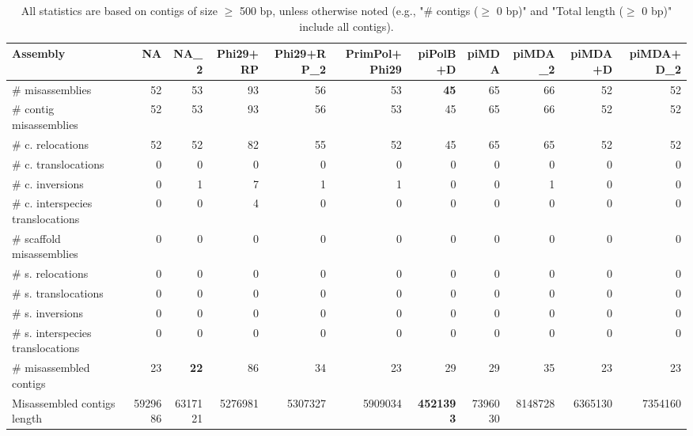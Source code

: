 \documentclass[12pt,a4paper]{article}
\begin{document}
\begin{table}[ht]
\begin{center}
\caption{All statistics are based on contigs of size $\geq$ 500 bp, unless otherwise noted (e.g., "\# contigs ($\geq$ 0 bp)" and "Total length ($\geq$ 0 bp)" include all contigs).}
\begin{tabular}{|l*{10}{|r}|}
\hline
Assembly & NA & NA\_2 & Phi29+RP & Phi29+RP\_2 & PrimPol+Phi29 & piPolB+D & piMDA & piMDA\_2 & piMDA+D & piMDA+D\_2 \\ \hline
\# misassemblies & 52 & 53 & 93 & 56 & 53 & {\bf 45} & 65 & 66 & 52 & 52 \\ \hline
\hspace{2mm}\# contig misassemblies & 52 & 53 & 93 & 56 & 53 & 45 & 65 & 66 & 52 & 52 \\ \hline
\hspace{5mm}\# c. relocations & 52 & 52 & 82 & 55 & 52 & 45 & 65 & 65 & 52 & 52 \\ \hline
\hspace{5mm}\# c. translocations & 0 & 0 & 0 & 0 & 0 & 0 & 0 & 0 & 0 & 0 \\ \hline
\hspace{5mm}\# c. inversions & 0 & 1 & 7 & 1 & 1 & 0 & 0 & 1 & 0 & 0 \\ \hline
\hspace{5mm}\# c. interspecies translocations & 0 & 0 & 4 & 0 & 0 & 0 & 0 & 0 & 0 & 0 \\ \hline
\hspace{2mm}\# scaffold misassemblies & 0 & 0 & 0 & 0 & 0 & 0 & 0 & 0 & 0 & 0 \\ \hline
\hspace{5mm}\# s. relocations & 0 & 0 & 0 & 0 & 0 & 0 & 0 & 0 & 0 & 0 \\ \hline
\hspace{5mm}\# s. translocations & 0 & 0 & 0 & 0 & 0 & 0 & 0 & 0 & 0 & 0 \\ \hline
\hspace{5mm}\# s. inversions & 0 & 0 & 0 & 0 & 0 & 0 & 0 & 0 & 0 & 0 \\ \hline
\hspace{5mm}\# s. interspecies translocations & 0 & 0 & 0 & 0 & 0 & 0 & 0 & 0 & 0 & 0 \\ \hline
\# misassembled contigs & 23 & {\bf 22} & 86 & 34 & 23 & 29 & 29 & 35 & 23 & 23 \\ \hline
Misassembled contigs length & 5929686 & 6317121 & 5276981 & 5307327 & 5909034 & {\bf 4521393} & 7396030 & 8148728 & 6365130 & 7354160 \\ \hline

\end{tabular}
\end{center}
\end{table}
\end{document}
